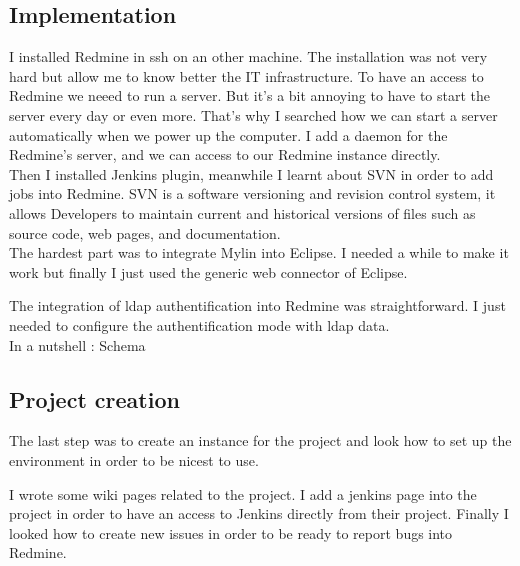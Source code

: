 
\subsection{Implementation}


I installed Redmine in ssh on an other machine. The installation was not very hard but allow me to know better the IT infrastructure. 
To have an access to Redmine we neeed to run a server. But it's a bit annoying to have to start the server every day or even more. 
That's why I searched how we can start a server automatically when we power up the computer. 
I add a daemon for the Redmine's server, and we can access to our Redmine instance directly. \\ 

Then I installed Jenkins plugin, meanwhile I learnt about SVN in order to add jobs into Redmine. 
SVN is a software versioning and revision control system, it allows Developers to maintain current and historical versions of files such as source code, web pages, and documentation. \\
 
The hardest part was to integrate Mylin into Eclipse. I needed a while to make it work but finally I just used the generic web connector of Eclipse. 

The integration of ldap authentification into Redmine was straightforward. I just needed to configure the authentification mode with ldap data. \\ 

In a nutshell : Schema

\subsection{Project creation}

The last step was to create an instance for the project and look how to set up the environment in order to be nicest to use. 

I wrote some wiki pages related to the project. I add a jenkins page into the project in order to have an access to Jenkins directly from their project.  
Finally I looked how to create new issues in order to be ready to report bugs into Redmine. 


